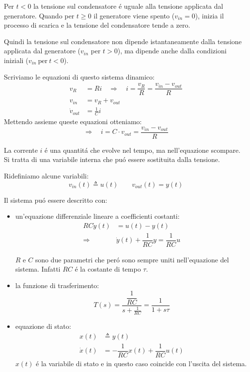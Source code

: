 \documentclass[../main.tex]{subfiles}
\begin{document}
		Per $ t<0 $ la tensione sul condensatore \'e uguale alla tensione applicata dal generatore. Quando per $ t\geq0 $ il generatore viene spento ($ v_{in}=0 $), inizia il processo di scarica e la tensione del condensatore tende a zero.
		
		Quindi la tensione sul condensatore non dipende istantaneamente dalla tensione applicata dal generatore ($ v_{in} $ per $ t>0 $), ma dipende anche dalla condizioni iniziali ($ v_{in}\ \mbox{per}\ t<0$).
		
		Scriviamo le equazioni di questo sistema dinamico:
		\begin{align*}
			v_R &= Ri \quad\Rightarrow\quad i = \dfrac{v_R}{R} = \dfrac{v_{in}-v_{out}}{R}\\
			v_{in} &= v_R + v_{out}\\
			\dot v_{out} &= \frac{1}{C}i 
		\end{align*}
		Mettendo assieme queste equazioni otteniamo:
		\[ \Rightarrow\quad i = C \cdot v_{out} = \dfrac{v_{in}-v_{out}}{R} \]
		
		La corrente $ i $ \'e una quantit\'a che evolve nel tempo, ma nell'equazione scompare. Si tratta di una variabile interna che pu\'o essere sostituita dalla tensione.
		
		Ridefiniamo alcune variabili:
		\[ v_{in}(t) \triangleq u(t) \qquad v_{out}(t) = y(t) \]
		
		Il sistema pu\'o essere descritto con:
		\begin{itemize}
			\item
				un'equazione differenziale lineare a coefficienti costanti:
				\begin{align*}
					RC \dot y(t) &= u(t) - y(t)\\
					\Rightarrow\quad & \dot y(t) + \dfrac{1}{RC} y = \dfrac{1}{RC} u
				\end{align*}
				
				$ R $ e $ C $ sono due parametri che per\'o sono sempre uniti nell'equazione del sistema. Infatti $ RC $ \'e la costante di tempo $ \tau $.
			\item
				la funzione di trasferimento:
				\[ T(s) = \dfrac{\dfrac{1}{RC}}{s+\frac{1}{RC}} = \dfrac{1}{1+s\tau} \] 
			\item
				equazione di stato:
				\begin{align*}
					x(t) &\triangleq y(t)\\
					\dot x(t) &= -\dfrac{1}{RC} x(t) + \dfrac{1}{RC} u(t)
				\end{align*}
				$ x(t) $ \'e la variabile di stato e in questo caso coincide con l'uscita del sistema.
		\end{itemize}
		
\end{document}
